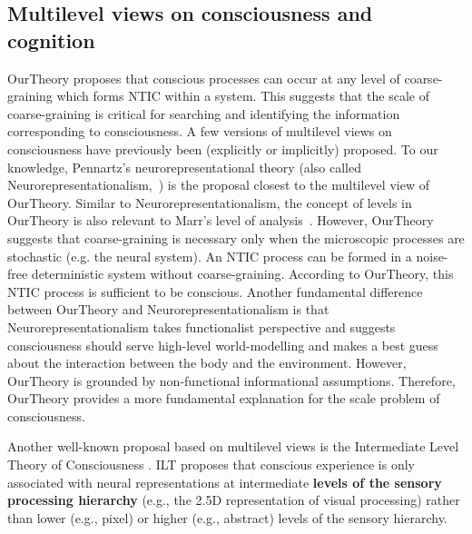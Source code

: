 \documentclass[utf8]{article}
\begin{document}
	
        \subsection{Multilevel views on consciousness and cognition}\label{sec:MultiLevelView}
    		\ac{OurTheory} proposes that conscious processes can occur at any level of coarse-graining which forms NTIC within a system. This suggests that the scale of coarse-graining is critical for searching and identifying the information corresponding to consciousness. A few versions of multilevel views on consciousness have previously been (explicitly or implicitly) proposed. To our knowledge, Pennartz's neurorepresentational theory (also called Neurorepresentationalism,~\citep{pennartz2018consciousness,pennartz2015brain}) is the proposal closest to the multilevel view of \ac{OurTheory}. Similar to Neurorepresentationalism, the concept of levels in \ac{OurTheory} is also relevant to Marr's level of analysis~\citep{marr1982vision, pennartz2015brain, pennartz2018consciousness}. 
    		However, \ac{OurTheory} suggests that coarse-graining is necessary only when the microscopic processes are stochastic (e.g. the neural system). An NTIC process can be formed in a noise-free deterministic system without coarse-graining. According to \ac{OurTheory}, this NTIC process is sufficient to be conscious. 
    		Another fundamental difference between \ac{OurTheory} and Neurorepresentationalism is that Neurorepresentationalism takes functionalist perspective and suggests consciousness should serve high-level world-modelling and makes a best guess about the interaction between the body and the environment. 
    		However, \ac{OurTheory} is grounded by non-functional informational assumptions. Therefore, \ac{OurTheory} provides a more fundamental explanation for the scale problem of consciousness. 
    		
    		Another well-known proposal based on multilevel views is the Intermediate Level Theory of Consciousness \citep[ILT]{prinz2007intermediate, jackendoff1987consciousness}. ILT proposes that conscious experience is only associated with neural representations at intermediate \textbf{levels of the sensory processing hierarchy} (e.g., the 2.5D representation of visual processing) rather than lower (e.g., pixel) or higher (e.g., abstract) levels of the sensory hierarchy. 
    	
\end{document}
